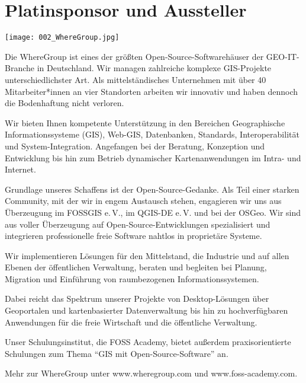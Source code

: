 \section*{Platinsponsor und Aussteller}

\vspace{-0.2cm}
\centerline{\texttt{[image: 002\_WhereGroup.jpg]}}
\noindent
Die WhereGroup ist eines der größten Open-Source-Software\-häuser der GEO-IT-Branche in Deutschland. Wir managen zahlreiche komplexe GIS-Projekte unterschiedlichster Art. Als mittelständisches Unternehmen mit über 40 Mitarbeiter*innen an vier Standorten arbeiten wir innovativ und haben dennoch die Bodenhaftung nicht verloren.

Wir bieten Ihnen kompetente Unterstützung in den Bereichen Geographische Informationssysteme (GIS), Web-GIS, Datenbanken, Standards, Interoperabilität und System-Integration. Angefangen bei der Beratung, Konzeption und Entwicklung bis hin zum Betrieb dynamischer Kartenanwendungen im Intra- und Internet.

Grundlage unseres Schaffens ist der Open-Source-Gedanke. Als Teil einer starken Community, mit der wir in engem Austausch stehen, engagieren wir uns aus Überzeugung im FOSSGIS e.\,V., im QGIS-DE e.\,V. und bei der OSGeo. Wir sind aus voller Überzeugung auf Open-Source-Entwicklungen spezialisiert und integrieren professionelle freie Software nahtlos in proprietäre Systeme.

Wir implementieren Lösungen für den Mittelstand, die Industrie und auf allen Ebenen der öffentlichen Verwaltung, beraten und begleiten bei Planung, Migration und Einführung von raumbezogenen Informationssystemen.

Dabei reicht das Spektrum unserer Projekte von Desktop-Lösungen über Geoportalen und kartenbasierter Datenverwaltung bis hin zu hochverfügbaren Anwendungen für die freie Wirtschaft und die öffentliche Verwaltung.

Unser Schulungsinstitut, die FOSS Academy, bietet außerdem praxisorientierte Schulungen zum Thema "`GIS mit Open-Source-Software"' an.

Mehr zur WhereGroup unter www.wheregroup.com und www.foss-academy.com.
\normalsize
